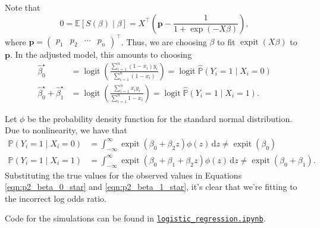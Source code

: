 \documentclass[letterpaper,11pt]{article}
\begin{document}
\begin{enumerate}
\begin{description}
    Note that \[
      0 = \mathbb{E}\left[S\left(\beta\right) \mid \beta \right]
      = X^\intercal\left(\mathbf{p} - \frac{1}{1 + \exp\left(-X\beta\right)}\right),
    \]
    where
    $\mathbf{p} = \begin{pmatrix} p_1 & p_2 & \cdots &
      p_n \end{pmatrix}^\intercal$. Thus, we are choosing $\beta$ to fit
    $\operatorname{expit}\left(X\beta\right)$ to $\mathbf{p}$.  In the adjusted
    model, this amounts to choosing
    \begin{align}
      \hat{\beta}_0^\star
      &= \operatorname{logit}\left(
      \frac{\sum_{i=1}^n \left(1 - x_i\right)y_i}{\sum_{i=1}^n\left(1 - x_i\right)}
        \right) =
        \operatorname{logit}\hat{\mathbb{P}}\left(Y_i = 1\mid X_i = 0\right)
        \label{eqn:p2_beta_0_star}\\
      \hat{\beta}_0^\star + \hat{\beta}_1^\star
      &=
      \operatorname{logit}\left(
      \frac{\sum_{i=1}^n x_iy_i}{\sum_{i=1}^n 1 - x_i}
      \right) =
        \operatorname{logit}\hat{\mathbb{P}}\left(Y_i = 1\mid X_i = 1\right).
        \label{eqn:p2_beta_1_star}
    \end{align}

    Let $\phi$ be the probability density function for the standard normal
    distribution. Due to nonlinearity, we have that
    \begin{align*}
      \mathbb{P}\left(Y_i = 1\mid X_i = 0\right)
      &= \int_{-\infty}^\infty \operatorname{expit}\left(
        \beta_0 + \beta_2z
        \right)\phi\left(z\right)\,\mathrm{d}z 
        \neq \operatorname{expit}\left(\beta_0\right)\\
      \mathbb{P}\left(Y_i = 1\mid X_i = 1\right)
      &= \int_{-\infty}^\infty \operatorname{expit}\left(
        \beta_0 + \beta_1 + \beta_2z
        \right)\phi\left(z\right)\,\mathrm{d}z 
        \neq \operatorname{expit}\left(\beta_0 + \beta_1\right).
    \end{align*}    
    Substituting the true values for the observed values in Equations
    \ref{eqn:p2_beta_0_star} and \ref{eqn:p2_beta_1_star}, it's clear that we're
    fitting to the incorrect log odds ratio.

    Code for the simulations can be found in
    \href{http://nbviewer.jupyter.org/github/ppham27/stat570/blob/master/hw8/logistic\_regression.ipynb}{\texttt{logistic\_regression.ipynb}}.
  \end{description}
\end{enumerate}
\end{document}
